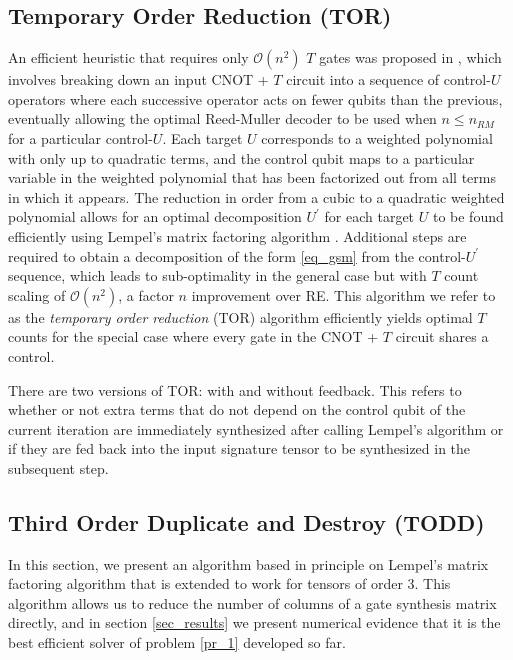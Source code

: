 \documentclass[titlepage]{article}
\theoremstyle{definition}
\theoremstyle{problem}
\theoremstyle{lemma}
\begin{document}
\subsection{Temporary Order Reduction (TOR)}
An efficient heuristic that requires only $\mathcal{O}(n^2)$ $T$ gates was proposed in \cite{4_Campbell_2017}, which involves breaking down an input CNOT + $T$ circuit into a sequence of control-$U$ operators where each successive operator acts on fewer qubits than the previous, eventually allowing the optimal Reed-Muller decoder to be used when $n\leq n_{RM}$ for a particular control-$U$. Each target $U$ corresponds to a weighted polynomial with only up to quadratic terms, and the control qubit maps to a particular variable in the weighted polynomial that has been factorized out from all terms in which it appears. The reduction in order from a cubic to a quadratic weighted polynomial allows for an optimal decomposition $U^\prime$ for each target $U$ to be found efficiently using Lempel's matrix factoring algorithm \cite{8_Lempel_1975}. Additional steps are required to obtain a decomposition of the form \ref{eq_gsm} from the control-$U^\prime$ sequence, which leads to sub-optimality in the general case but with $T$ count scaling of $\mathcal{O}(n^2)$, a factor $n$ improvement over RE. This algorithm we refer to as the \emph{temporary order reduction} (TOR) algorithm efficiently yields optimal $T$ counts for the special case where every gate in the CNOT + $T$ circuit shares a control.

There are two versions of TOR: with and without feedback. This refers to whether or not extra terms that do not depend on the control qubit of the current iteration are immediately synthesized after calling Lempel's algorithm or if they are fed back into the input signature tensor to be synthesized in the subsequent step.

\subsection{Third Order Duplicate and Destroy (TODD)}

In this section, we present an algorithm based in principle on Lempel's matrix factoring algorithm \cite{8_Lempel_1975} that is extended to work for tensors of order 3. This algorithm allows us to reduce the number of columns of a gate synthesis matrix directly, and in section \ref{sec_results} we present numerical evidence that it is the best efficient solver of problem \ref{pr_1} developed so far.
\end{document}
